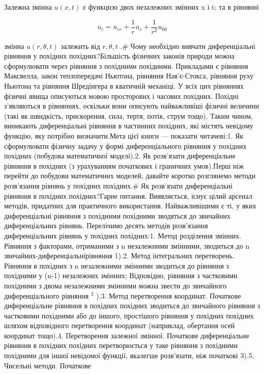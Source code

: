 \documentclass[
  ukrainian,
]{article}
\begin{document}
Залежна змінна \(u(x, t)\) є функцією двох незалежних змінних x і t; та
в рівнянні

\[
u_t = u_{rr} + \frac{1}{r} u_r + \frac{1}{r^2} u_{00}
\]

змінна \(u(r, \theta, t)\) залежить від \(r, \theta, t\) .\# Чому
необхідно вивчати диференціальні рівняння у похідних похідних?Більшість
фізичних законів природи можна сформулювати через рівняння з похідними
похідними. Прикладами є рівняння Максвелла, закон теплопередачі Ньютона,
рівняння Нав'є-Стокса, рівняння руху Ньютона та рівняння Шредінгера в
кватичній механіці. У всіх цих рівняннях фізичні явища описуються мовою
просторових і часових похідних. Похідні з'являються в рівняннях,
оскільки вони описують найважливіші фізичні величини (такі як швидкість,
прискорення, сила, тертя, потік, струм тощо). Таким чином, виникають
диференціальні рівняння в частинних похідних, які містять невідому
функцію, яку потрібно визначити.Мета цієї книги --- показати читачеві:1.
Як сформулювати фізичну задачу у формі диференціального рівняння у
похідних похідних (побудова математичної моделі).2. Як розв'язати
диференціальне рівняння в похідних (з урахуванням початкових і граничних
умов).Перш ніж перейти до побудови математичних моделей, давайте коротко
розглянемо методи розв'язання рівнянь у похідних похідних.\# Як
розв'язати диференціальні рівняння в похідних похідних?Гарне питання.
Виявляється, існує цілий арсенал методів, придатних для практичного
використання. Найважливішими є ті, у яких диференціальні рівняння з
похідними похідними зводяться до звичайних диференціальних рівнянь.
Перелічимо десять методів розв'язання диференціальних рівнянь у похідних
похідних:1. Метод розділення змінних. Рівняння з факторами, отриманими з
n незалежними змінними, зводиться до n звичайних-диференціальнірівняння
1).2. Метод інтегральних перетворень. Рівняння в похідних з n
незалежними змінними зводиться до рівняння з похідними у (n-1)
незалежних змінних; Відповідно, рівняння з частковими похідними з двома
незалежними змінними можна звести до звичайного диференціального
рівняння \(^2\) ).3. Метод перетворення координат. Початкове
диференціальне рівняння в похідних похідних зводиться до звичайного
рівняння з частковими похідними або до іншого, простішого рівняння у
похідних похідних шляхом відповідного перетворення координат (наприклад,
обертання осей координат тощо).4. Перетворення залежної змінної.
Початкове диференціальне рівняння в похідних похідних перетворюється у
таке рівняння з похідними похідними для іншої невідомої функції,
якалегше розв'язати, ніж початкові 3).5. Чисельні методи. Початкове
\end{document}
